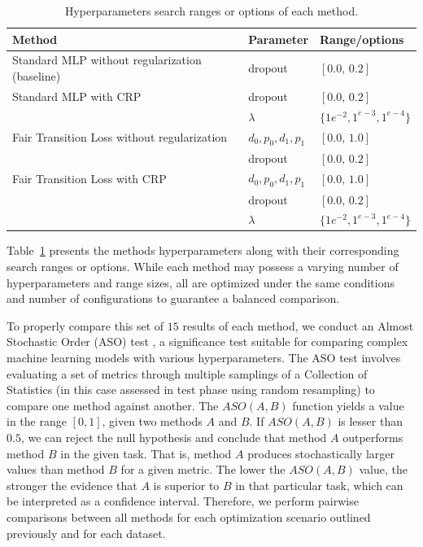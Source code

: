 \begin{table}[ht]
\centering
\caption{Hyperparameters search ranges or options of each method.}\label{tab:hyperparameters_crp}
{\footnotesize
\begin{tabular}{lll}
\toprule
Method & Parameter & Range/options \\ \midrule
 Standard MLP without regularization (baseline) & dropout & $[0.0,\,0.2]$  \vspace{1ex} \\
 Standard MLP with CRP & dropout & $[0.0,\,0.2]$  \vspace{1ex} \\
 & $\lambda$ & $\{1e^{-2}, 1^{e-3}, 1^{e-4}\}$ \\
 Fair Transition Loss without regularization & $d_0,p_0,d_1,p_1$ & $[0.0,\,1.0]$ \\
 &  dropout & $[0.0,\,0.2]$ \\
 Fair Transition Loss with CRP & $d_0,p_0,d_1,p_1$ & $[0.0,\,1.0]$ \\
 &  dropout & $[0.0,\,0.2]$ \\
 & $\lambda$ & $\{1e^{-2}, 1^{e-3}, 1^{e-4}\}$ \\
\bottomrule
\end{tabular}
}
\end{table}

Table~\ref{tab:hyperparameters_crp} presents the methods hyperparameters along with their corresponding search ranges or options. While each method may possess a varying number of hyperparameters and range sizes, all are optimized under the same conditions and number of configurations to guarantee a balanced comparison.

To properly compare this set of $15$ results of each method, we conduct an Almost Stochastic Order (ASO) test \citep{dror2019deep}, a significance test suitable for comparing complex machine learning models with various hyperparameters. The ASO test involves evaluating a set of metrics through multiple samplings of a Collection of Statistics (in this case assessed in test phase using random resampling) to compare one method against another. The $ASO(A, B)$ function yields a value in the range $[0, 1]$, given two methods $A$ and $B$. If $ASO(A, B)$ is lesser than $0.5$, we can reject the null hypothesis and conclude that method $A$ outperforms method $B$ in the given task. That is, method $A$ produces stochastically larger values than method $B$ for a given metric. The lower the $ASO(A, B)$ value, the stronger the evidence that $A$ is superior to $B$ in that particular task, which can be interpreted as a confidence interval. Therefore, we perform pairwise comparisons between all methods for each optimization scenario outlined previously and for each dataset.

